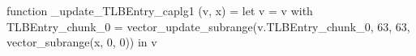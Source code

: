 function _update_TLBEntry_caplg1 (v, x) = let v = { v with TLBEntry_chunk_0 = vector_update_subrange(v.TLBEntry_chunk_0, 63, 63, vector_subrange(x, 0, 0)) } in v
